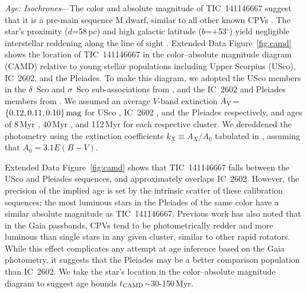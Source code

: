 \documentclass{nature3}
\begin{document}
\begin{methods}
{\it Age: Isochrones}---The color and absolute magnitude of
TIC~141146667 suggest that it is a pre-main sequence M dwarf, similar
to all other known CPVs \cite{Stauffer2017,Stauffer2021,Bouma2024}.
The star's proximity ($d$=58\,pc) and high galactic latitude
($b$=$+$53$^\circ$) yield negligible interstellar reddening along the
line of sight \cite{Green2019}.  Extended Data Figure~\ref{fig:camd}
shows the location of TIC~141146667 in the color--absolute magnitude
diagram (CAMD) relative to young stellar populations including Upper
Scorpius (USco), IC~2602, and the Pleiades.  To make this diagram, we
adopted the USco members in the $\delta$~Sco and $\sigma$~Sco
sub-associations from \cite{Ratzenbock2023}, and the IC~2602 and
Pleiades members from \cite{Hunt2024}.  We assumed an average $V$-band
extinction $A_{\rm V}$=$\{0.12, 0.11, 0.10\}\,{\rm mag}$ for USco
\cite{Pecaut2016}, IC~2602 \cite{Hunt2024}, and the Pleiades
\cite{Hunt2024} respectively, and ages of 8\,Myr
\cite{Ratzenbock2023}, 40\,Myr \cite{Randich2018}, and 112\,Myr
\cite{Dahm2015} for each respective cluster.  We dereddened the
photometry using the extinction coefficients $k_X\equiv A_X/A_0$
tabulated in \cite{GaiaCollaboration2018}, assuming that $A_0 = 3.1
E(B-V)$.

Extended Data Figure~\ref{fig:camd} shows that TIC~141146667 falls
between the USco and Pleiades sequences, and approximately overlaps
IC~2602.  However, the precision of the implied age is set by the
intrinsic scatter of these calibration sequences; the most luminous
stars in the Pleiades of the same color have a similar absolute
magnitude as TIC~141146667.  Previous work \cite{Stauffer2021} has
also noted that in the Gaia passbands, CPVs tend to be photometrically
redder and more luminous than single stars in any given cluster,
similar to other rapid rotators.  While this effect complicates any
attempt at age inference based on the Gaia photometry, it suggests
that the Pleiades may be a better comparison population than IC~2602.
We take the star's location in the color--absolute magnitude diagram
to suggest age bounds $t_{\rm CAMD}$$\sim$30-150\,Myr.



\end{methods}
\end{document}
